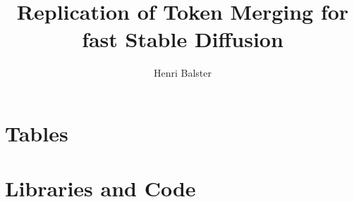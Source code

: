 \documentclass[12pt,a4paper]{article}
\title{Replication of Token Merging for fast Stable Diffusion}
\author{Henri Balster}
\date{}
\begin{document}

\newpage
\tableofcontents
\onehalfspacing
\newpage
{}








\newpage


\newpage






\newpage
\appendix
{}
\section{Tables}


\newpage
\section{Libraries and Code}

\\


\newpage
\let\Section\section 
\def\section*#1{\Section{#1}} 


\end{document}
